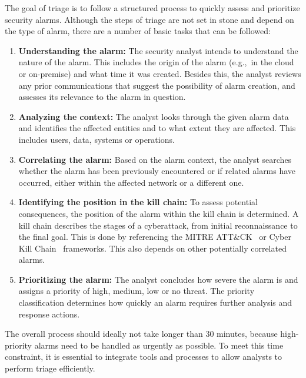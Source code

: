 The goal of triage is to follow a structured process to quickly assess and prioritize security alarms.
Although the steps of triage are not set in stone and depend on the type of alarm, there are a number of basic tasks
that can be followed:
\begin{enumerate}
    \item \textbf{Understanding the alarm:} The security analyst intends to understand the nature of the alarm.
    This includes the origin of the alarm (e.g.,\ in the cloud or on-premise) and what time it was created.
    Besides this, the analyst reviews any prior communications that suggest the possibility of alarm creation, and
    assesses its relevance to the alarm in question.

    \item \textbf{Analyzing the context:} The analyst looks through the given alarm data and identifies the affected
    entities and to what extent they are affected.
    This includes users, data, systems or operations.

    \item \textbf{Correlating the alarm:}
    Based on the alarm context, the analyst searches whether the alarm has been previously encountered or if related
    alarms have occurred, either within the affected network or a different one.

    \item \textbf{Identifying the position in the kill chain:}
    To assess potential consequences, the position of the alarm within the kill chain is determined.
    A kill chain describes the stages of a cyberattack, from initial reconnaissance to the final goal.
    This is done by referencing the MITRE ATT\&CK\ \citep{strom2018mitre} or Cyber Kill Chain\ \citep{lockheed2011ckc}
    frameworks.
    This also depends on other potentially correlated alarms.

    \item \textbf{Prioritizing the alarm:}
    The analyst concludes how severe the alarm is and assigns a priority of high, medium, low or no threat.
    The priority classification determines how quickly an alarm requires further analysis and response actions.
\end{enumerate}

The overall process should ideally not take longer than 30 minutes, because high-priority alarms need to be handled as
urgently as possible.
To meet this time constraint, it is essential to integrate tools and processes to allow analysts to perform triage
efficiently.

